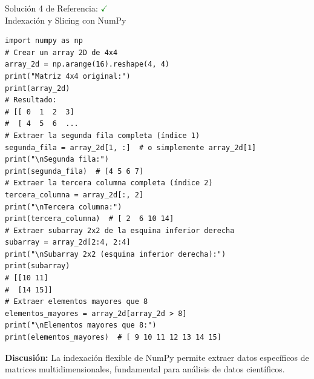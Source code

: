 \documentclass[10pt]{beamer}
\begin{document}
\begin{solutionblock}
\begin{frame}[fragile]{Solución 4 de Referencia: \hfill \textcolor{green}{$\checkmark$} \\ Indexación y Slicing con NumPy}
\begin{verbatim}
import numpy as np
# Crear un array 2D de 4x4
array_2d = np.arange(16).reshape(4, 4)
print("Matriz 4x4 original:")
print(array_2d)
# Resultado:
# [[ 0  1  2  3]
#  [ 4  5  6  ...
# Extraer la segunda fila completa (índice 1)
segunda_fila = array_2d[1, :]  # o simplemente array_2d[1]
print("\nSegunda fila:")
print(segunda_fila)  # [4 5 6 7]
# Extraer la tercera columna completa (índice 2)
tercera_columna = array_2d[:, 2]
print("\nTercera columna:")
print(tercera_columna)  # [ 2  6 10 14]
# Extraer subarray 2x2 de la esquina inferior derecha
subarray = array_2d[2:4, 2:4]
print("\nSubarray 2x2 (esquina inferior derecha):")
print(subarray)
# [[10 11]
#  [14 15]]
# Extraer elementos mayores que 8
elementos_mayores = array_2d[array_2d > 8]
print("\nElementos mayores que 8:")
print(elementos_mayores)  # [ 9 10 11 12 13 14 15]
\end{verbatim}
\textbf{Discusión:} La indexación flexible de NumPy permite extraer datos específicos de matrices multidimensionales, fundamental para análisis de datos científicos.
\end{frame}
\end{solutionblock}
\end{document}
